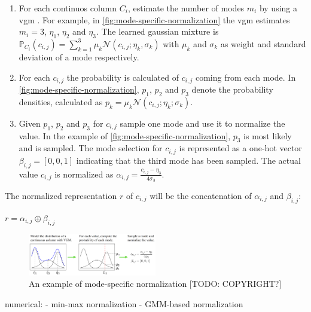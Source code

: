 \begin{enumerate}
    \item For each continuos column $C_i$, estimate the number of modes $m_i$ by using a \gls{vgm} \cite{bishop2006PatternRecognitionMachine}. 
    For example, in \autoref{fig:mode-specific-normalization} the \gls{vgm} estimates $m_i=3$, $\eta_1$, $\eta_2$ and $\eta_3$. 
    The learned gaussian mixture is  
    $\mathbb{P}_{C_i}(c_{i,j})=\sum_{k=1}^{3}\mu_k\mathcal{N}(c_{i,j};\eta_k, \sigma_k)$
    with $\mu_k$ and $\sigma_k$ as weight and standard deviation of a mode respectively.
    \item For each $c_{i,j}$ the probability is calculated of $c_{i,j}$ coming from each mode. 
    In \autoref{fig:mode-specific-normalization}, $p_1$, $p_2$ and $p_3$ denote the probability densities, calculated as $p_k=\mu_k\mathcal{N}(c_{i,j};\eta_k;\sigma_k)$.
    \item Given $p_1$, $p_2$ and $p_3$ for $c_{i,j}$ sample one mode and use it to normalize the value. 
    In the example of \autoref{fig:mode-specific-normalization}, $p_3$ is most likely and is sampled.
    The mode selection for $c_{i,j}$ is represented as a one-hot vector $\beta_{i,j}=[0,0,1]$ indicating that the third mode has been sampled.
    The actual value $c_{i,j}$ is normalized as $\alpha_{i,j}=\frac{c_{i,j}-\eta_3}{4\sigma_3}$. 
\end{enumerate}

The normalized representation $r$ of $c_{i,j}$ will be the concatenation of $\alpha_{i,j}$ and $\beta_{i,j}$: 

$r=\alpha_{i,j}\oplus\beta_{i,j}$



\begin{figure}[h]
    \centering
    \includegraphics[width=0.5\textwidth]{images/mode-normalization.png}
    \caption{An example of mode-specific normalization [TODO: COPYRIGHT?] \cite[Figure 1, p. 4]{xu2019ModelingTabularData}}
    \label{fig:mode-specific-normalization}
  \end{figure}


numerical:
- min-max normalization
- GMM-based normalization














